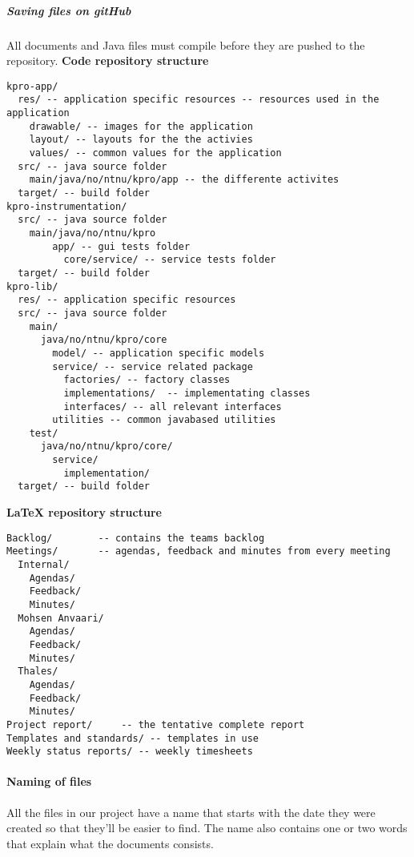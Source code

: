 \subparagraph{Saving files on gitHub}\hfill
\newline
All documents and Java files must compile before they are pushed to the repository.
\newline
\newline
\textbf{Code repository structure}
\begin{verbatim}
kpro-app/
  res/ -- application specific resources -- resources used in the application
    drawable/ -- images for the application
    layout/ -- layouts for the the activies
    values/ -- common values for the application
  src/ -- java source folder
    main/java/no/ntnu/kpro/app -- the differente activites
  target/ -- build folder
kpro-instrumentation/
  src/ -- java source folder
    main/java/no/ntnu/kpro
	    app/ -- gui tests folder
		  core/service/ -- service tests folder
  target/ -- build folder
kpro-lib/
  res/ -- application specific resources
  src/ -- java source folder
    main/
      java/no/ntnu/kpro/core
        model/ -- application specific models
        service/ -- service related package
          factories/ -- factory classes
          implementations/  -- implementating classes
          interfaces/ -- all relevant interfaces
        utilities -- common javabased utilities
    test/
      java/no/ntnu/kpro/core/
        service/
          implementation/
  target/ -- build folder

\end{verbatim}
\textbf{LaTeX repository structure}
\begin{verbatim}
Backlog/		-- contains the teams backlog
Meetings/		-- agendas, feedback and minutes from every meeting
  Internal/
    Agendas/
    Feedback/
    Minutes/
  Mohsen Anvaari/
    Agendas/
    Feedback/
    Minutes/
  Thales/
    Agendas/
    Feedback/
    Minutes/
Project report/		-- the tentative complete report
Templates and standards/ -- templates in use
Weekly status reports/ -- weekly timesheets

\end{verbatim}

\paragraph{Naming of files}\hfill
\newline
All the files in our project have a name that starts with the date they were created so that they’ll be easier to find. The name also contains one or two words that explain what the documents consists.

